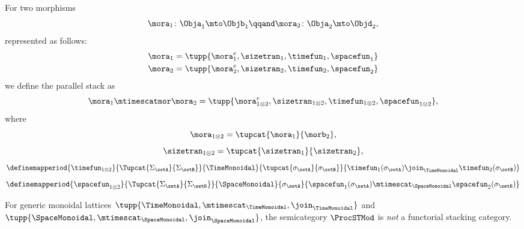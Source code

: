 \begin{lemma}
    For two morphisms
    \begin{equation}
        \mora_1 \colon \Obja_1 \mto \Objb_1
        \qqand
        \mora_2 \colon \Obja_2 \mto \Objd_2,
    \end{equation}
    represented as follows:
    \begin{align}
        \mora_1 & = \tupp{\mora^e_1, \sizetran_1,  \timefun_1,
        \spacefun_{1}  }                                                       \\
        \mora_2 & = \tupp{\mora^e_2, \sizetran_2,  \timefun_2, \spacefun_{2} }
    \end{align}
    we define the parallel stack as
    \begin{equation}
        \mora_1 \mtimescatmor \mora_2 = \tupp{
        \mora^e_{1\otimes2},
        \sizetran_{1\otimes2},
        \timefun_{1\otimes2},
        \spacefun_{1\otimes2}
        },
    \end{equation}
    where
    \begin{equation}
        \mora_{1\otimes2} = \tupcat {\mora_1}  {\morb_2},
    \end{equation}
    \begin{equation}
        \sizetran_{1\otimes2} =  \tupcat {\sizetran_1}  {\sizetran_2},
    \end{equation}
    \begin{equation}
        \definemapperiod{
            \timefun_{1\otimes 2}
        }{
            \Tupcat {\Sigma_{\setA}} {\Sigma_{\setB}}
        }{
            \TimeMonoidal
        }{
            \tupcat {\sigma_{\setA}} {\sigma_{\setB}}
        }{
            \timefun_1(\sigma_{\setA}) \join_{\TimeMonoidal} \timefun_2(\sigma_{\setB})
        }
    \end{equation}
    \begin{equation}
        \definemapperiod{
            \spacefun_{1\otimes2}
        }{
            \Tupcat {\Sigma_{\setA}} {\Sigma_{\setB}}
        }{
            \SpaceMonoidal
        }{
            \sigma_{\setA}
        }{
            \spacefun_1(\sigma_{\setA}) \mtimescat_{\SpaceMonoidal} \spacefun_2(\sigma_{\setB})
        }
    \end{equation}
\end{lemma}

\begin{lemma}
    For generic monoidal lattices $\tupp{\TimeMonoidal, \mtimescat_{\TimeMonoidal}, \join_{\TimeMonoidal}}$ and $\tupp{\SpaceMonoidal, \mtimescat_{\SpaceMonoidal}, \join_{\SpaceMonoidal}}$, the semicategory $\ProcSTMod$  is \emph{not} a functorial stacking category.
\end{lemma}

